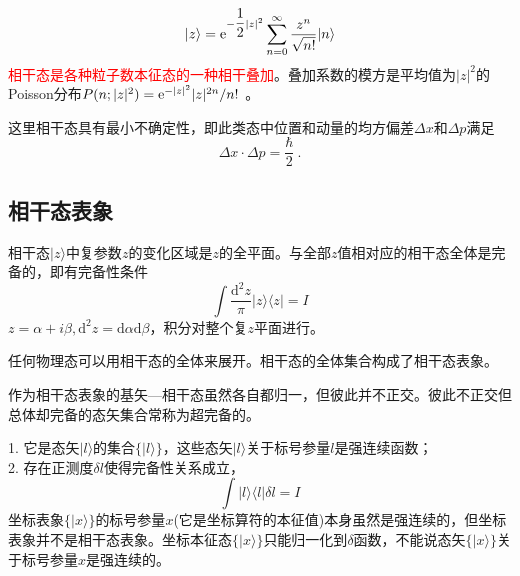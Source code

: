 \documentclass[11pt,a4paper]{article}
\newcommand{\dif}{\mathrm{d}}
\begin{document}
\begin{equation}
|z \rangle = {\rm e}^{-\dfrac{1}{2}|z|^2} \sum_{n=0}^\infty \dfrac{z^n}{\sqrt{n!}} |n\rangle
\end{equation}
\textcolor{red}{相干态是各种粒子数本征态的一种相干叠加}。叠加系数的模方是平均值为$|z|^2$的Poisson分布$P(n; |z|^2) = {\rm e}^{-|z|^2} |z|^{2n} / n!$ 。



这里相干态具有最小不确定性，即此类态中位置和动量的均方偏差$\Delta x$和$\Delta p$满足
\begin{equation}
\Delta x \cdot \Delta p = \dfrac{\hbar}{2} ~.
\end{equation}






\subsection{相干态表象}
相干态$|z\rangle$中复参数$z$的变化区域是$z$的全平面。与全部$z$值相对应的相干态全体是完备的，即有完备性条件
\begin{equation}
\int \dfrac{\dif^2 z}{\pi} |z\rangle \langle z| = I
\end{equation}
$z = \alpha +i\beta, \dif^2 z = \dif \alpha \dif \beta$，积分对整个复$z$平面进行。



任何物理态可以用相干态的全体来展开。相干态的全体集合构成了相干态表象。

作为相干态表象的基矢---相干态虽然各自都归一，但彼此并不正交。彼此不正交但总体却完备的态矢集合常称为超完备的。

1. 它是态矢$| l \rangle$的集合$\{| l \rangle \}$，这些态矢$| l \rangle$关于标号参量$l$是强连续函数；\\
2. 存在正测度$\delta l$使得完备性关系成立，
\begin{equation}
\int | l \rangle \langle l | \delta l = I
\end{equation}
坐标表象$\{|x\rangle \}$的标号参量$x$(它是坐标算符的本征值)本身虽然是强连续的，但坐标表象并不是相干态表象。坐标本征态$\{|x\rangle \}$只能归一化到$\delta$函数，不能说态矢$\{|x\rangle \}$关于标号参量$x$是强连续的。
\end{document}
